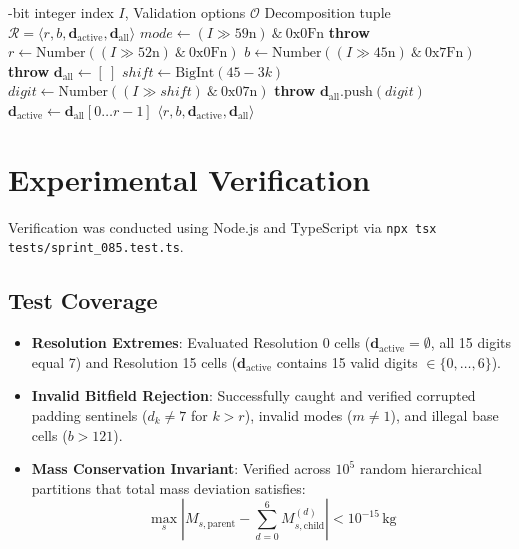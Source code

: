 \documentclass[10pt,journal,compsoc]{IEEEtran}
\begin{document}
\begin{algorithm}[htbp]
\caption{Bitwise H3 Aperture Digit Extraction}
\label{alg:extract}
\begin{algorithmic}[1]
-bit integer index $I$, Validation options $\mathcal{O}$
\ENSURE Decomposition tuple $\mathcal{R} = \langle r, b, \mathbf{d}_{\text{active}}, \mathbf{d}_{\text{all}} \rangle$
\STATE $mode \leftarrow (I \gg 59\text{n}) \ \& \ 0\text{x0Fn}$
    \STATE \textbf{throw} 
\ENDIF
\STATE $r \leftarrow \text{Number}((I \gg 52\text{n}) \ \& \ 0\text{x0Fn})$
\STATE $b \leftarrow \text{Number}((I \gg 45\text{n}) \ \& \ 0\text{x7Fn})$
    \STATE \textbf{throw} 
\ENDIF
\STATE $\mathbf{d}_{\text{all}} \leftarrow [ \ ]$
    \STATE $shift \leftarrow \text{BigInt}(45 - 3k)$
    \STATE $digit \leftarrow \text{Number}((I \gg shift) \ \& \ 0\text{x07n})$
        \STATE \textbf{throw} 
    \ENDIF
    \STATE $\mathbf{d}_{\text{all}}.\text{push}(digit)$
\ENDFOR
\STATE $\mathbf{d}_{\text{active}} \leftarrow \mathbf{d}_{\text{all}}[0 \dots r-1]$
\RETURN $\langle r, b, \mathbf{d}_{\text{active}}, \mathbf{d}_{\text{all}} \rangle$
\end{algorithmic}
\end{algorithm}

\section{Experimental Verification}
Verification was conducted using Node.js and TypeScript via \texttt{npx tsx tests/sprint\_085.test.ts}. 

\subsection{Test Coverage}
\begin{itemize}
    \item \textbf{Resolution Extremes}: Evaluated Resolution 0 cells ($\mathbf{d}_{\text{active}} = \emptyset$, all 15 digits equal 7) and Resolution 15 cells ($\mathbf{d}_{\text{active}}$ contains 15 valid digits $\in \{0,\dots,6\}$).
    \item \textbf{Invalid Bitfield Rejection}: Successfully caught and verified corrupted padding sentinels ($d_k \neq 7$ for $k > r$), invalid modes ($m \neq 1$), and illegal base cells ($b > 121$).
    \item \textbf{Mass Conservation Invariant}: Verified across $10^5$ random hierarchical partitions that total mass deviation satisfies:
    \begin{equation}
    \max_{s} \left| M_{s,\text{parent}} - \sum_{d=0}^{6} M_{s,\text{child}}^{(d)} \right| < 10^{-15}\,\text{kg}
    \end{equation}
\end{itemize}
\end{document}
